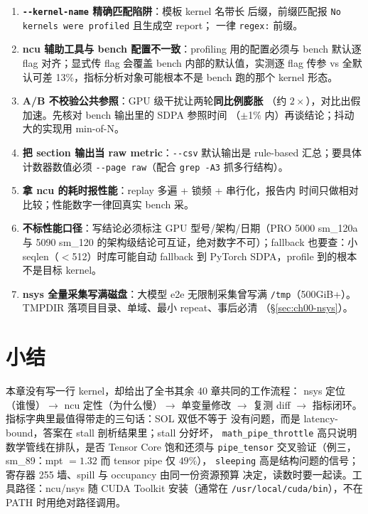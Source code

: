 \begin{enumerate}
\item \textbf{\texttt{-{}-kernel-name} 精确匹配陷阱}：模板 kernel 名带长
  后缀，前缀匹配报 \texttt{No kernels were profiled} 且生成空 report；
  一律 \texttt{regex:} 前缀。
\item \textbf{ncu 辅助工具与 bench 配置不一致}：profiling 用的配置必须与
  bench 默认逐 flag 对齐；显式传 flag 会覆盖 bench 内部的默认值，实测逐
  flag 传参 vs 全默认可差 13\%，指标分析对象可能根本不是 bench 跑的那个
  kernel 形态。
\item \textbf{A/B 不校验公共参照}：GPU 级干扰让两轮\textbf{同比例膨胀}
  （约 $2\times$），对比出假加速。先核对 bench 输出里的 SDPA 参照时间
  （$\pm$1\% 内）再谈结论；抖动大的实现用 min-of-N。
\item \textbf{把 section 输出当 raw metric}：\texttt{-{}-csv} 默认输出是
  rule-based 汇总；要具体计数器数值必须 \texttt{-{}-page raw}（配合
  \texttt{grep -A3} 抓多行结构）。
\item \textbf{拿 ncu 的耗时报性能}：replay 多遍 + 锁频 + 串行化，报告内
  时间只做相对比较；性能数字一律回真实 bench 采。
\item \textbf{不标性能口径}：写结论必须标注 GPU 型号/架构/日期（PRO 5000
  sm\_120a 与 5090 sm\_120 的架构级结论可互证，绝对数字不可）；fallback
  也要查：小 seqlen（$<$512）时库可能自动 fallback 到 PyTorch SDPA，profile
  到的根本不是目标 kernel。
\item \textbf{nsys 全量采集写满磁盘}：大模型 e2e 无限制采集曾写满
  \texttt{/tmp}（500GiB+）。TMPDIR 落项目目录、单域、最小 repeat、事后必清
  （\S\ref{sec:ch00-nsys}）。
\end{enumerate}

\section{小结}

本章没有写一行 kernel，却给出了全书其余 40 章共同的工作流程：
nsys 定位（谁慢）$\to$ ncu 定性（为什么慢）$\to$ 单变量修改 $\to$
复测 diff $\to$ 指标闭环。指标字典里最值得带走的三句话：SOL 双低不等于
没有问题，而是 latency-bound，答案在 stall 剖析结果里；stall 分好坏，
\texttt{math\_\allowbreak{}pipe\_\allowbreak{}throttle} 高只说明数学管线在排队，是否 Tensor Core
饱和还须与 \texttt{pipe\_\allowbreak{}tensor} 交叉验证（例三，sm\_89：mpt $=1.32$ 而 tensor pipe 仅 $49\%$），
\texttt{sleeping} 高是结构问题的信号；寄存器 255 墙、spill 与 occupancy 由同一份资源预算
决定，读数时要一起读。工具路径：ncu/nsys 随 CUDA Toolkit 安装（通常在
\texttt{/\allowbreak{}usr/\allowbreak{}local/\allowbreak{}cuda/\allowbreak{}bin}），不在 PATH 时用绝对路径调用。

